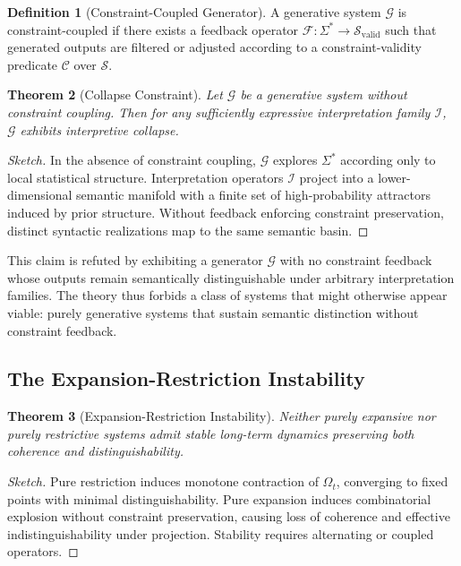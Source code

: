 \documentclass[12pt, a4paper]{article}
\theoremstyle{plain}
\newtheorem{theorem}{Theorem}[section]
\theoremstyle{definition}
\newtheorem{definition}[theorem]{Definition}
\theoremstyle{remark}
\begin{document}
\begin{definition}[Constraint-Coupled Generator]
A generative system $\mathcal{G}$ is constraint-coupled if there exists a feedback operator $\mathcal{F} : \Sigma^* \to \mathcal{S}_{\mathrm{valid}}$ such that generated outputs are filtered or adjusted according to a constraint-validity predicate $\mathcal{C}$ over $\mathcal{S}$.
\end{definition}

\begin{theorem}[Collapse Constraint]
Let $\mathcal{G}$ be a generative system without constraint coupling. Then for any sufficiently expressive interpretation family $\mathcal{I}$, $\mathcal{G}$ exhibits interpretive collapse.
\end{theorem}

\begin{proof}[Sketch]
In the absence of constraint coupling, $\mathcal{G}$ explores $\Sigma^*$ according only to local statistical structure. Interpretation operators $\mathcal{I}$ project into a lower-dimensional semantic manifold with a finite set of high-probability attractors induced by prior structure. Without feedback enforcing constraint preservation, distinct syntactic realizations map to the same semantic basin.
\end{proof}

This claim is refuted by exhibiting a generator $\mathcal{G}$ with no constraint feedback whose outputs remain semantically distinguishable under arbitrary interpretation families. The theory thus forbids a class of systems that might otherwise appear viable: purely generative systems that sustain semantic distinction without constraint feedback.

\subsection{The Expansion-Restriction Instability}

\begin{theorem}[Expansion-Restriction Instability]
Neither purely expansive nor purely restrictive systems admit stable long-term dynamics preserving both coherence and distinguishability.
\end{theorem}

\begin{proof}[Sketch]
Pure restriction induces monotone contraction of $\Omega_t$, converging to fixed points with minimal distinguishability. Pure expansion induces combinatorial explosion without constraint preservation, causing loss of coherence and effective indistinguishability under projection. Stability requires alternating or coupled operators.
\end{proof}
\end{document}
